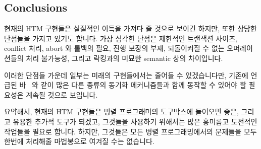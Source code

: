 \subsection{Conclusions}
\label{sec:future:Conclusions}

현재의 HTM 구현들은 실질적인 이득을 가져다 줄 것으로 보이긴 하지만, 또한 상당한
단점들을 가지고 있기도 합니다.
가장 심각한 단점은 제한적인 트랜잭션 사이즈, conflict 처리, abort 와 롤백의
필요, 진행 보장의 부재, 되돌이켜질 수 없는 오퍼레이션들의 처리 불가능성, 그리고
락킹과의 미묘한 semantic 상의 차이입니다.
\iffalse

Although current HTM implementations appear to be poised to deliver real
benefits, they also have significant shortcomings.
The most significant shortcomings appear to be
limited transaction sizes,
the need for conflict handling, the need for aborts and rollbacks,
the lack of forward-progress guarantees,
the inability to handle irrevocable operations,
and subtle semantic differences
from locking.
\fi

이러한 단점들 가운데 일부는 미래의 구현들에서는 줄어들 수 있겠습니다만, 기존에
언급된 바~\cite{McKenney2007PLOSTM,PaulEMcKenney2010OSRGrassGreener} 와 같이
많은 다른 종류의 동기화 메커니즘들과 함께 동작할 수 있어야 할 필요성은 계속될
것으로 보입니다.

요약해서, 현재의 HTM 구현들은 병렬 프로그래머의 도구박스에 들어오면 좋은,
그리고 유용한 추가적 도구가 되겠고, 그것들을 사용하기 위해서는 많은 흥미롭고
도전적인 작업들을 필요로 합니다.
하지만, 그것들은 모든 병렬 프로그래밍에서의 문제들을 모두 한번에 처리해줄
마법봉으로 여겨질 수는 없습니다.
\iffalse

Some of these shortcomings might be alleviated in future implementations,
but it appears that there will continue to be a strong need to make
HTM work well with the many other types of synchronization mechanisms,
as noted earlier~\cite{McKenney2007PLOSTM,PaulEMcKenney2010OSRGrassGreener}.

In short, current HTM implementations appear to be welcome and useful
additions to the parallel programmer's toolbox, and much interesting
and challenging work is required to make use of them.
However, they cannot be
considered to be a magic wand with which to wave away all parallel-programming
problems.
\fi
